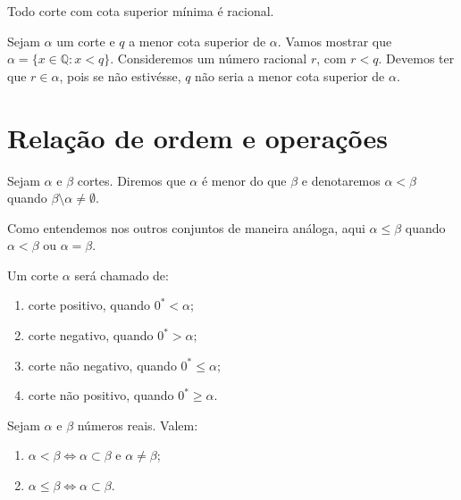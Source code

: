 \documentclass[../main.tex]{subfiles}
\begin{document}
\begin{teo}
    Todo corte com cota superior mínima é racional.
\end{teo}
\begin{dem}
    Sejam $\alpha$ um corte e $q$ a menor cota superior de $\alpha$. Vamos mostrar que $\alpha = \{ x \in \mathbb{Q} : x < q \}$.
    Consideremos um número racional $r$, com $r < q$. Devemos ter que $r \in \alpha$, pois se não estivésse, $q$ não seria a menor cota superior de $\alpha$.
\end{dem}



\section{Relação de ordem e operações}

\begin{defi}
    Sejam $\alpha$ e $\beta$ cortes. Diremos que $\alpha$ é menor do que $\beta$ e denotaremos $\alpha < \beta$ quando $\beta \setminus \alpha \neq \emptyset$.
\end{defi}
\begin{obs}
    Como entendemos nos outros conjuntos de maneira análoga, aqui $\alpha \leq \beta$ quando $\alpha < \beta$ ou $\alpha = \beta$.
\end{obs}
\begin{defi}
    Um corte $\alpha$ será chamado de:
    \begin{enumerate}
        \item corte positivo, quando $0^* < \alpha$;
        \item corte negativo, quando $0^* > \alpha$;
        \item corte não negativo, quando $0^* \leq \alpha$;
        \item corte não positivo, quando $0^* \geq \alpha$.
    \end{enumerate}
\end{defi}

\begin{teo}\label{reais-teo-subset}
    Sejam $\alpha$ e $\beta$ números reais. Valem:
    \begin{enumerate}[label=(\roman*)]
        \item $\alpha < \beta \iff \alpha \subset \beta$ e $\alpha \neq \beta$;
        \item $\alpha \leq \beta \iff \alpha \subset \beta$.
    \end{enumerate}
\end{teo}
\end{document}
